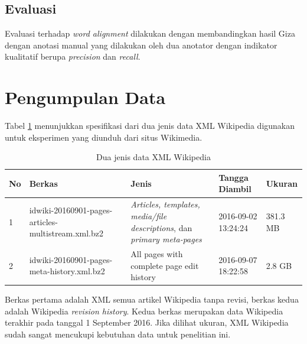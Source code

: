 
\subsection{}


\subsection{Evaluasi}
Evaluasi terhadap \textit{word alignment} dilakukan dengan membandingkan hasil Giza dengan anotasi manual yang dilakukan oleh dua anotator dengan indikator kualitatif berupa \textit{precision} dan \textit{recall}. 

\section{Pengumpulan Data}
Tabel \ref{table:dataXML} menunjukkan spesifikasi dari dua jenis data XML Wikipedia digunakan untuk eksperimen yang diunduh dari situs Wikimedia.

\begin{table}
	\centering
	\caption{Dua jenis data XML Wikipedia}
	\label{table:dataXML}
		\begin{tabular}{|p{0.7cm}|p{4cm}|p{4cm}|p{2cm}|p{1.5cm}|}
			\hline
			No & Berkas & Jenis & Tangga Diambil & Ukuran \\ 
			\hline
			1    & 
			idwiki-20160901-pages-articles-multistream.xml.bz2   & \textit{Articles, templates, media/file descriptions}, dan \textit{primary meta-pages}  & 2016-09-02 13:24:24  & 
			381.3 MB  \\ \hline
			2    & 
			idwiki-20160901-pages-meta-history.xml.bz2     & 
			All pages with complete page edit history  & 
			2016-09-07 18:22:58  & 
			2.8 GB    \\ \hline
		\end{tabular}
\end{table}
\noindent Berkas pertama adalah XML semua artikel Wikipedia tanpa revisi, berkas kedua adalah Wikipedia \textit{revision history}. Kedua berkas merupakan data Wikipedia terakhir pada tanggal 1 September 2016. Jika dilihat ukuran, XML Wikipedia sudah sangat mencukupi kebutuhan data untuk penelitian ini.


